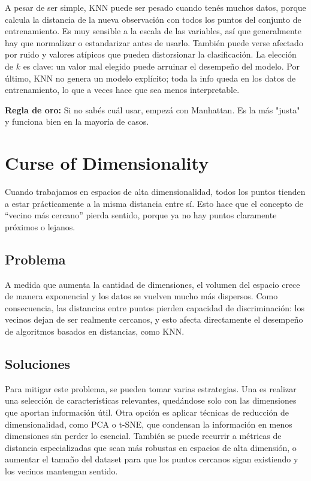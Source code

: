 \documentclass[12pt]{article}
\begin{document}
A pesar de ser simple, KNN puede ser pesado cuando tenés muchos datos, porque calcula la distancia de la nueva observación con todos los puntos del conjunto de entrenamiento. Es muy sensible a la escala de las variables, así que generalmente hay que normalizar o estandarizar antes de usarlo. También puede verse afectado por ruido y valores atípicos que pueden distorsionar la clasificación. La elección de $k$ es clave: un valor mal elegido puede arruinar el desempeño del modelo. Por último, KNN no genera un modelo explícito; toda la info queda en los datos de entrenamiento, lo que a veces hace que sea menos interpretable.

\textbf{Regla de oro:} Si no sabés cuál usar, empezá con Manhattan. Es la más "justa" y funciona bien en la mayoría de casos.

\section{Curse of Dimensionality}

Cuando trabajamos en espacios de alta dimensionalidad, todos los puntos tienden a estar prácticamente a la misma distancia entre sí. Esto hace que el concepto de ``vecino más cercano'' pierda sentido, porque ya no hay puntos claramente próximos o lejanos.

\subsection{Problema}

A medida que aumenta la cantidad de dimensiones, el volumen del espacio crece de manera exponencial y los datos se vuelven mucho más dispersos. Como consecuencia, las distancias entre puntos pierden capacidad de discriminación: los vecinos dejan de ser realmente cercanos, y esto afecta directamente el desempeño de algoritmos basados en distancias, como KNN.

\subsection{Soluciones}

Para mitigar este problema, se pueden tomar varias estrategias. Una es realizar una selección de características relevantes, quedándose solo con las dimensiones que aportan información útil. Otra opción es aplicar técnicas de reducción de dimensionalidad, como PCA o t-SNE, que condensan la información en menos dimensiones sin perder lo esencial. También se puede recurrir a métricas de distancia especializadas que sean más robustas en espacios de alta dimensión, o aumentar el tamaño del dataset para que los puntos cercanos sigan existiendo y los vecinos mantengan sentido.
\end{document}
